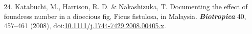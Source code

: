 \documentclass[
]{article}
\newenvironment{cslreferences}%
  {}%
  {\par}
\begin{document}
\begin{cslreferences}
\leavevmode\hypertarget{ref-Katabuchi2008}{}%
24. Katabuchi, M., Harrison, R. D. \& Nakashizuka, T. Documenting the
effect of foundress number in a dioecious fig, Ficus fistulosa, in
Malaysia. \emph{\textbf{Biotropica}} 40, 457--461 (2008),
doi:\href{https://doi.org/10.1111/j.1744-7429.2008.00405.x}{10.1111/j.1744-7429.2008.00405.x}.
\end{cslreferences}
\end{document}
